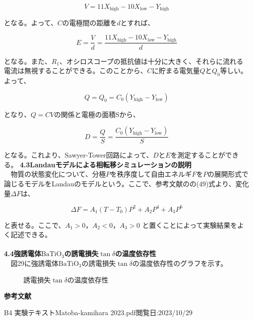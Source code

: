 \documentclass[a4paper,10.5pt]{ltjsarticle}
\begin{document}
\begin{displaymath}
  V=11X_\mathrm{high}-10X_\mathrm{low}-Y_\mathrm{high}
\end{displaymath}

となる。よって、$C$の電極間の距離を$d$とすれば、

\begin{displaymath}
  E=\frac{V}{d}=\frac{11X_\mathrm{high}-10X_\mathrm{low}-Y_\mathrm{high}}{d}
\end{displaymath}

となる。また、$R_1$、オシロスコープの抵抗値は十分に大きく、それらに流れる電流は無視することができる。このことから、$C$に貯まる電気量$Q$と$Q_0$等しい。よって、

\begin{displaymath}
  Q=Q_0=C_0(Y_\mathrm{high}-Y_\mathrm{low})
\end{displaymath}

となり、$Q=CV$の関係と電極の面積Sから、

\begin{displaymath}
  D=\frac{Q}{S}=\frac{C_0(Y_\mathrm{high}-Y_\mathrm{low})}{S}
\end{displaymath}

となる。これより、Sawyer-Tower回路によって、$D$と$E$を測定することができる。
\clearpage
{\large \bfseries 4.3Landauモデルによる相転移シミュレーションの説明}\\
　物質の状態変化について、分極$P$を秩序度して自由エネルギ$F$を$P$の展開形式で論じるモデルをLandauのモデルという。ここで、参考文献の\cite{text}の(49)式より、変化量$\Delta F$は、

\begin{displaymath}
  \Delta F=A_1(T-T_0)P^2+A_2P^4+A_3P^6
\end{displaymath}

と表せる。ここで、$A_1>0，A_2<0，A_3>0$ と置くことによって実験結果をよく記述できる。\\
\\
{\large \bfseries 4.4強誘電体$\mathrm{BaTiO_3}$の誘電損失$\tan{\delta}$の温度依存性}\\
　図29に強誘電体$\mathrm{BaTiO_3}$の誘電損失$\tan{\delta}$の温度依存性のグラフを示す。

\begin{figure}[h]
  \centering
  
  \vspace{-1.4cm}
  \caption{誘電損失$\tan{\delta}$の温度依存性}
\end{figure}




{\Large \bfseries 参考文献}
\begin{thebibliography}{1}
\vspace{-1.5cm}
   B4 実験テキストMatoba-kamihara 2023.pdf閲覧日:2023/10/29
\end{thebibliography}
\end{document}
